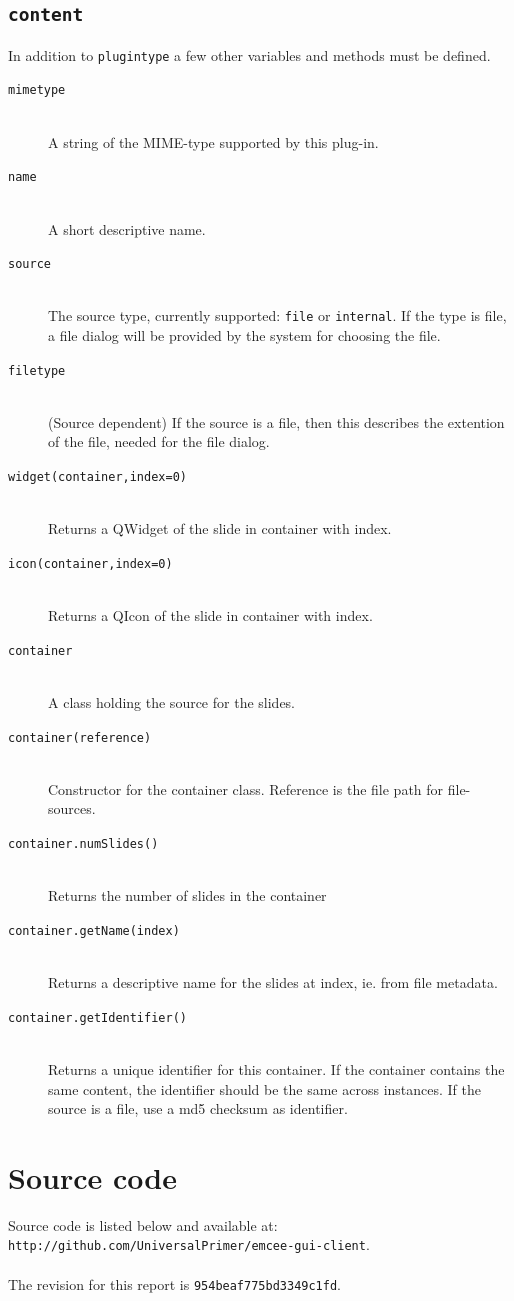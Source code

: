 \documentclass[a4paper,12pt]{article}
\newcommand{\ditem}[1]{\item[\texttt{{#1}}] \hfill \\}
\begin{document}
\subsection{\texttt{content}}
In addition to \texttt{plugintype} a few other variables and methods must be defined.
\begin{description}
\ditem{mimetype}
A string of the MIME-type supported by this plug-in.

\ditem{name}
A short descriptive name.

\ditem{source}
The source type, currently supported: \texttt{file} or \texttt{internal}. If the type is file, a file dialog will be provided by the system for choosing the file.

\ditem{filetype}
(Source dependent) If the source is a file, then this describes the extention of the file, needed for the file dialog.

\ditem{widget(container,index=0)}
Returns a QWidget of the slide in container with index.

\ditem{icon(container,index=0)}
Returns a QIcon of the slide in container with index.

\ditem{container}
A class holding the source for the slides.

\ditem{container(reference)}
Constructor for the container class. Reference is the file path for file-sources.

\ditem{container.numSlides()} 
Returns the number of slides in the container

\ditem{container.getName(index)} 
Returns a descriptive name for the slides at index, ie. from file metadata.

\ditem{container.getIdentifier()} 
Returns a unique identifier for this container. If the container contains the same content, the identifier should be the same across instances. If the source is a file, use a md5 checksum as identifier.

\end{description}

\section{Source code}
Source code is listed below and available at:
\\
\texttt{http://github.com/UniversalPrimer/emcee-gui-client}. 
\\
\\
The revision for this report is \texttt{954beaf775bd3349c1fd}.
\\
\end{document}
